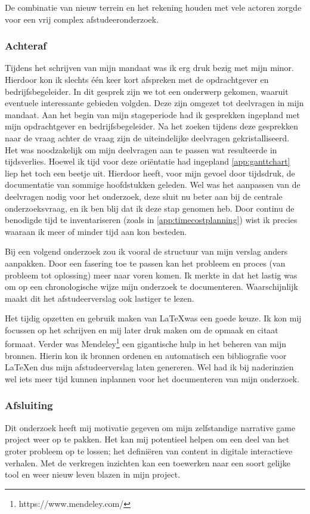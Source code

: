 De combinatie van nieuw terrein en het rekening houden met vele actoren zorgde voor een vrij complex afstudeeronderzoek.

\subsubsection{Achteraf}
Tijdens het schrijven van mijn mandaat was ik erg druk bezig met mijn minor. Hierdoor kon ik slechts één keer kort afspreken met de opdrachtgever en bedrijfsbegeleider. In dit gesprek zijn we tot een onderwerp gekomen, waaruit eventuele interessante gebieden volgden. Deze zijn omgezet tot deelvragen in mijn mandaat. Aan het begin van mijn stageperiode had ik gesprekken ingepland met mijn opdrachtgever en bedrijfsbegeleider. Na het zoeken tijdens deze gesprekken naar de vraag achter de vraag zijn de uiteindelijke deelvragen gekristalliseerd. Het was noodzakelijk om mijn deelvragen aan te passen wat resulteerde in tijdsverlies. Hoewel ik tijd voor deze oriëntatie had ingepland \autoref{app:ganttchart} liep het toch een beetje uit. Hierdoor heeft, voor mijn gevoel door tijdsdruk, de documentatie van sommige hoofdstukken geleden. Wel was het aanpassen van de deelvragen nodig voor het onderzoek, deze sluit nu beter aan bij de centrale onderzoeksvraag, en ik ben blij dat ik deze stap genomen heb. Door continu de benodigde tijd te inventariseren (zoals in \autoref{app:timecostplanning}) wist ik precies waaraan ik meer of minder tijd aan kon besteden.

Bij een volgend onderzoek zou ik vooral de structuur van mijn verslag anders aanpakken. Door een fasering toe te passen kan het probleem en proces (van probleem tot oplossing) meer naar voren komen. Ik merkte in dat het lastig was om op een chronologische wijze mijn onderzoek te documenteren. Waarschijnlijk maakt dit het afstudeerverslag ook lastiger te lezen.

Het tijdig opzetten en gebruik maken van \LaTeX was een goede keuze. Ik kon mij focussen op het schrijven en mij later druk maken om de opmaak en citaat formaat. Verder was Mendeley\footnote{https://www.mendeley.com/} een gigantische hulp in het beheren van mijn bronnen. Hierin kon ik bronnen ordenen en automatisch een bibliografie voor \LaTeX en dus mijn afstudeerverslag laten genereren. Wel had ik bij naderinzien wel iets meer tijd kunnen inplannen voor het documenteren van mijn onderzoek.

\subsubsection{Afsluiting}
Dit onderzoek heeft mij motivatie gegeven om mijn zelfstandige narrative game project weer op te pakken. Het kan mij potentieel helpen om een deel van het groter probleem op te lossen; het definiëren van content in digitale interactieve verhalen. Met de verkregen inzichten kan een toewerken naar een soort gelijke tool en weer nieuw leven blazen in mijn project.